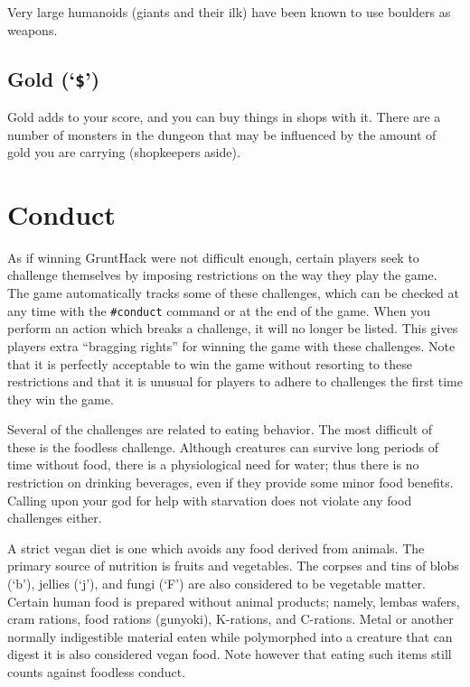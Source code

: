 Very large humanoids (giants and their ilk) have been known to use boulders
as weapons.
\subsection*{Gold (`{\tt \$}')}

Gold adds to your score, and you can buy things in shops with it.
There are a number
of monsters in the dungeon that may be influenced by the amount of gold
you are carrying (shopkeepers aside).

\section{Conduct}

As if winning GruntHack were not difficult enough, certain players
seek to challenge themselves by imposing restrictions on the
way they play the game.  The game automatically tracks some of
these challenges, which can be checked at any time with the {\tt \#conduct}
command or at the end of the game.  When you perform an action which
breaks a challenge, it will no longer be listed.  This gives
players extra ``bragging rights'' for winning the game with these
challenges.  Note that it is perfectly acceptable to win the game
without resorting to these restrictions and that it is unusual for
players to adhere to challenges the first time they win the game.

Several of the challenges are related to eating behavior.  The most
difficult of these is the foodless challenge.  Although creatures
can survive long periods of time without food, there is a physiological
need for water; thus there is no restriction on drinking beverages,
even if they provide some minor food benefits.
Calling upon your god for help with starvation does
not violate any food challenges either.

A strict vegan diet is one which avoids any food derived from animals.
The primary source of nutrition is fruits and vegetables.  The
corpses and tins of blobs (`b'), jellies (`j'), and fungi (`F') are
also considered to be vegetable matter.  Certain human
food is prepared without animal products; namely, lembas wafers, cram
rations, food rations (gunyoki), K-rations, and C-rations.
Metal or another normally indigestible material eaten while polymorphed
into a creature that can digest it is also considered vegan food.
Note however that eating such items still counts against foodless conduct.

